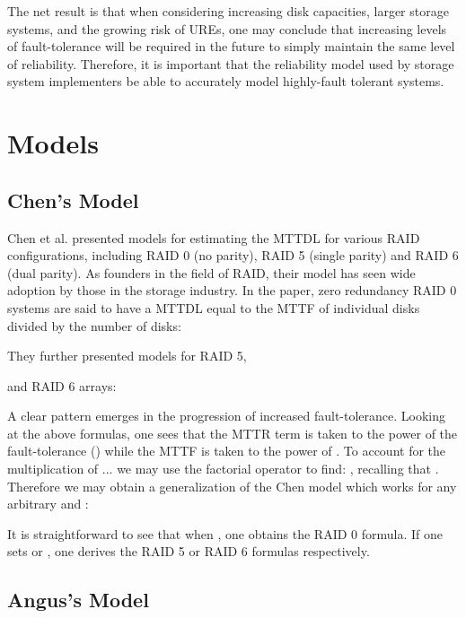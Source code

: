 \documentclass[XXX,endnotes]{usetex-v1}
\begin{document}
The net result is that when considering increasing disk capacities, larger storage systems, and the growing risk of UREs, one may conclude that increasing levels of fault-tolerance will be required in the future to simply maintain the same level of reliability.  Therefore, it is important that the reliability model used by storage system implementers be able to accurately model highly-fault tolerant systems. 

\section{Models}

\subsection{Chen's Model}

Chen et al. presented models for estimating the MTTDL for various RAID configurations\cite{reliability}, including RAID 0 (no parity), RAID 5 (single parity) and RAID 6 (dual parity).  As founders in the field of RAID, their model has seen wide adoption by those in the storage industry.  In the paper, zero redundancy RAID 0 systems are said to have a MTTDL equal to the MTTF of individual disks divided by the number of disks:



They further presented models for RAID 5,



and RAID 6 arrays:



A clear pattern emerges in the progression of increased fault-tolerance.  Looking at the above formulas, one sees that the MTTR term is taken to the power of the fault-tolerance () while the MTTF is taken to the power of .  To account for the multiplication of  ...  we may use the factorial operator to find: , recalling that .  Therefore we may obtain a generalization of the Chen model which works for any arbitrary  and :



It is straightforward to see that when , one obtains the RAID 0 formula.  If one sets  or , one derives the RAID 5 or RAID 6 formulas respectively.

\subsection{Angus's Model}
\end{document}
